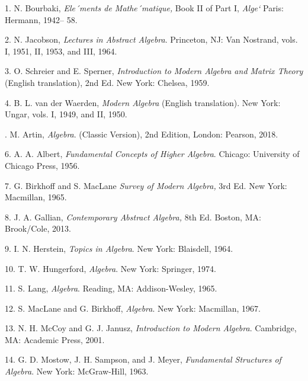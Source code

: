 \documentclass[11pt,oneside]{article}
\begin{document}
\fi
\renewcommand{\BookFooter}{Bibliography}
\ifdefined\BookMaster\else\setcounter{page}{395}\fi
\BookNarrativetrue

\begin{BookBody}



1. N. Bourbaki,\textit{ Ele´ments de Mathe´matique,} Book II of Part I,\textit{ Alge`} Paris: Hermann, 1942– 58.

2. N. Jacobson,\textit{ Lectures in Abstract Algebra}. Princeton, NJ: Van Nostrand, vols. I, 1951, II, 1953, and III, 1964.

3. O. Schreier and E. Sperner,\textit{ Introduction to Modern Algebra and Matrix Theory} (English translation), 2nd Ed. New York: Chelsea, 1959.

4. B. L. van der Waerden,\textit{ Modern Algebra} (English translation). New York: Ungar, vols. I, 1949, and II, 1950.


. M. Artin,\textit{ Algebra}. (Classic Version), 2nd Edition, London: Pearson, 2018.

6. A. A. Albert,\textit{ Fundamental Concepts of Higher Algebra}. Chicago: University of Chicago Press, 1956.

7. G. Birkhoff and S. MacLane \textit{Survey of Modern Algebra,} 3rd Ed. New York: Macmillan, 1965.

8. J. A. Gallian,\textit{ Contemporary Abstract Algebra,} 8th Ed. Boston, MA: Brook/Cole, 2013.

9. I. N. Herstein,\textit{ Topics in Algebra}. New York: Blaisdell, 1964.

10. T. W. Hungerford,\textit{ Algebra}. New York: Springer, 1974.

11. S. Lang,\textit{ Algebra}. Reading, MA: Addison-Wesley, 1965.

12. S. MacLane and G. Birkhoff,\textit{ Algebra}. New York: Macmillan, 1967.

13. N. H. McCoy and G. J. Janusz,\textit{ Introduction to Modern Algebra}. Cambridge, MA: Academic Press, 2001.

14. G. D. Mostow, J. H. Sampson, and J. Meyer,\textit{ Fundamental Structures of Algebra}. New York: McGraw-Hill, 1963.


\end{BookBody}
\end{document}
